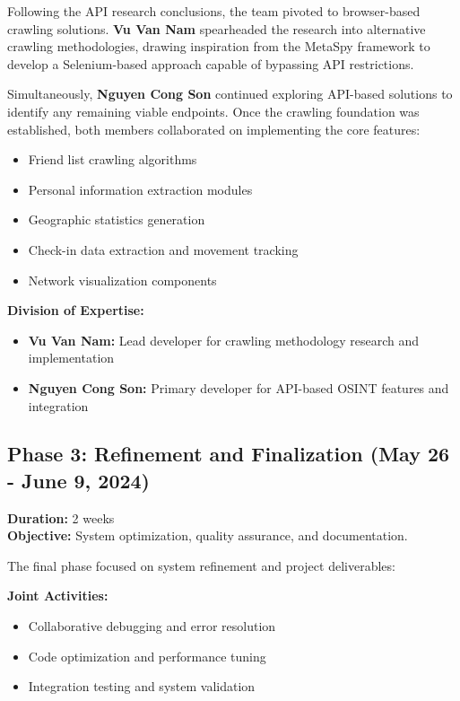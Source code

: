 \documentclass[13pt,a4paper]{report}
\begin{document}
Following the API research conclusions, the team pivoted to browser-based crawling solutions. \textbf{Vu Van Nam} spearheaded the research into alternative crawling methodologies, drawing inspiration from the MetaSpy framework to develop a Selenium-based approach capable of bypassing API restrictions.

Simultaneously, \textbf{Nguyen Cong Son} continued exploring API-based solutions to identify any remaining viable endpoints. Once the crawling foundation was established, both members collaborated on implementing the core features:

\begin{itemize}
    \item Friend list crawling algorithms
    \item Personal information extraction modules
    \item Geographic statistics generation
    \item Check-in data extraction and movement tracking
    \item Network visualization components
\end{itemize}

\textbf{Division of Expertise:}
\begin{itemize}
    \item \textbf{Vu Van Nam:} Lead developer for crawling methodology research and implementation
    \item \textbf{Nguyen Cong Son:} Primary developer for API-based OSINT features and integration
\end{itemize}

\subsection{Phase 3: Refinement and Finalization (May 26 - June 9, 2024)}
\textbf{Duration:} 2 weeks \\
\textbf{Objective:} System optimization, quality assurance, and documentation.

The final phase focused on system refinement and project deliverables:

\textbf{Joint Activities:}
\begin{itemize}
    \item Collaborative debugging and error resolution
    \item Code optimization and performance tuning
    \item Integration testing and system validation
\end{itemize}
\end{document}
